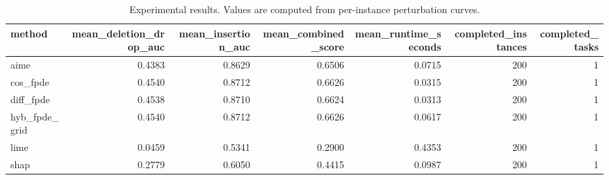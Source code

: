 \begin{table}[t]
\caption{Experimental results. Values are computed from per-instance perturbation curves.}
\label{tab:main_results_computed}
\centering
\begin{tabular}{lrrrrrr}
\toprule
method & mean\_deletion\_drop\_auc & mean\_insertion\_auc & mean\_combined\_score & mean\_runtime\_seconds & completed\_instances & completed\_tasks \\
\midrule
aime & 0.4383 & 0.8629 & 0.6506 & 0.0715 & 200 & 1 \\
cos\_fpde & 0.4540 & 0.8712 & 0.6626 & 0.0315 & 200 & 1 \\
diff\_fpde & 0.4538 & 0.8710 & 0.6624 & 0.0313 & 200 & 1 \\
hyb\_fpde\_grid & 0.4540 & 0.8712 & 0.6626 & 0.0617 & 200 & 1 \\
lime & 0.0459 & 0.5341 & 0.2900 & 0.4353 & 200 & 1 \\
shap & 0.2779 & 0.6050 & 0.4415 & 0.0987 & 200 & 1 \\
\bottomrule
\end{tabular}

\end{table}
